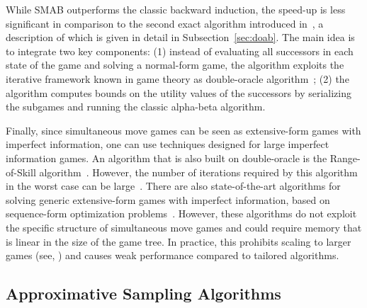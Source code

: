 While SMAB outperforms the classic backward induction, the speed-up is less significant in comparison to the second exact algorithm introduced in~\cite{Bosansky13Using}, a description of which is given in detail in Subsection~\ref{sec:doab}.
The main idea is to integrate two key components: (1) instead of evaluating all successors in each state of the game and solving a normal-form game, the algorithm exploits the iterative framework known in game theory as double-oracle algorithm~\cite{McMahan03Planning}; (2) the algorithm computes bounds on the utility values of the successors by serializing the subgames and running the classic alpha-beta algorithm. 

Finally, since simultaneous move games can be seen as extensive-form games with imperfect information, one can use techniques 
designed for large imperfect information games. 
An algorithm that is also built on double-oracle is the Range-of-Skill algorithm~\cite{Zinkevich07New}.  
However, the number of iterations required by this algorithm in the worst case can be large~\cite{Hansen08On}. 
There are also state-of-the-art algorithms for solving generic extensive-form games with imperfect information, based on sequence-form 
optimization problems~\cite{koller1996,Sandholm10The,bosansky2013-aamas}. 
However, these algorithms do not exploit the specific structure of simultaneous move games and could require memory that is linear 
in the size of the game tree. In practice, this prohibits scaling to larger games (see, \eg \cite{Saffidine12SMAB}) and causes weak performance
compared to tailored algorithms.


\subsection{Approximative Sampling Algorithms} \label{sec:related:sampling}

